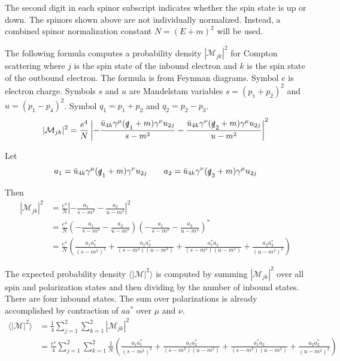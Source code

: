\documentclass[12pt]{article}
\begin{document}
\noindent
The second digit in each spinor subscript indicates whether the spin state is up or down.
The spinors shown above are not individually normalized.
Instead, a combined spinor normalization constant $N=(E+m)^2$ will be used.

\bigskip
\noindent
The following formula computes a probability density $|\mathcal{M}_{jk}|^2$
for Compton scattering where $j$ is the spin state of the inbound electron
and $k$ is the spin state of the outbound electron.
The formula is from Feynman diagrams.
Symbol $e$ is electron charge.
Symbols $s$ and $u$ are Mandelstam variables $s=(p_1+p_2)^2$ and $u=(p_1-p_4)^2$.
Symbol $q_1=p_1+p_2$ and $q_2=p_2-p_3$.
\begin{equation*}
|\mathcal{M}_{jk}|^2
=
\frac{e^4}{N}
\left|
-\frac{\bar{u}_{4k}\gamma^\mu(\slashed{q}_1+m)\gamma^\nu u_{2j}}{s-m^2}
-\frac{\bar{u}_{4k}\gamma^\nu(\slashed{q}_2+m)\gamma^\mu u_{2j}}{u-m^2}
\right|^2
\end{equation*}

\noindent
Let
\begin{equation*}
a_1=\bar{u}_{4k}\gamma^\mu(\slashed{q}_1+m)\gamma^\nu u_{2j}
\qquad
a_2=\bar{u}_{4k}\gamma^\nu(\slashed{q}_2+m)\gamma^\mu u_{2j}
\end{equation*}

\noindent
Then
\begin{align*}
|\mathcal{M}_{jk}|^2&=\frac{e^4}{N}\left|-\frac{a_1}{s-m^2}-\frac{a_2}{u-m^2}\right|^2\\
&=
\frac{e^4}{N}
\left(-\frac{a_1}{s-m^2}-\frac{a_2}{u-m^2}\right)
\left(-\frac{a_1}{s-m^2}-\frac{a_2}{u-m^2}\right)^*\\
&=
\frac{e^4}{N}\left(
\frac{a_1a_1^*}{(s-m^2)^2}
+\frac{a_1a_2^*}{(s-m^2)(u-m^2)}
+\frac{a_1^*a_2}{(s-m^2)(u-m^2)}
+\frac{a_2a_2^*}{(u-m^2)^2}
\right)
\end{align*}

\noindent
The expected probability density $\langle|\mathcal{M}|^2\rangle$ is
computed by summing $|\mathcal{M}_{jk}|^2$ over all spin and polarization states
and then dividing by the number of inbound states.
There are four inbound states.
The sum over polarizations is already accomplished by contraction of $aa^*$ over $\mu$ and $\nu$.
\begin{align*}
\langle|\mathcal{M}|^2\rangle
&=\frac{1}{4}\sum_{j=1}^2\sum_{k=1}^2|\mathcal{M}_{jk}|^2\\
&=\frac{e^4}{4}\sum_{j=1}^2\sum_{k=1}^2
\frac{1}{N}\left(
\frac{a_1a_1^*}{(s-m^2)^2}
+\frac{a_1a_2^*}{(s-m^2)(u-m^2)}
+\frac{a_1^*a_2}{(s-m^2)(u-m^2)}
+\frac{a_2a_2^*}{(u-m^2)^2}
\right)
\end{align*}
\end{document}
